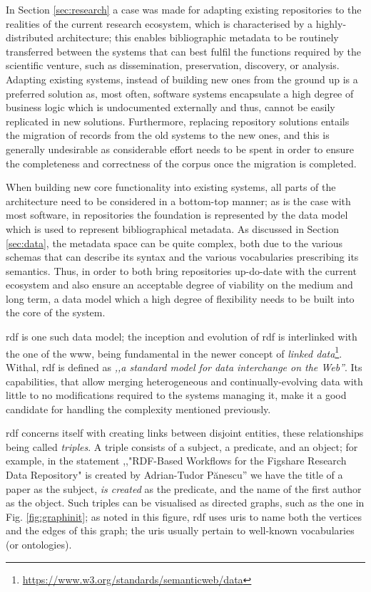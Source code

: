 In Section \ref{sec:research} a case was made for adapting existing repositories to the realities of the current research ecosystem, which is characterised by a highly-distributed architecture; this enables bibliographic metadata to be routinely transferred between the systems that can best fulfil the functions required by the scientific venture, such as dissemination, preservation, discovery, or analysis. Adapting existing systems, instead of building new ones from the ground up is a preferred solution as, most often, software systems encapsulate a high degree of business logic which is undocumented externally and thus, cannot be easily replicated in new solutions. Furthermore, replacing repository solutions entails the migration of records from the old systems to the new ones, and this is generally undesirable as considerable effort needs to be spent in order to ensure the completeness and correctness of the corpus once the migration is completed.

When building new core functionality into existing systems, all parts of the architecture need to be considered in a bottom-top manner; as is the case with most software, in repositories the foundation is represented by the data model which is used to represent bibliographical metadata. As discussed in Section \ref{sec:data}, the metadata space can be quite complex, both due to the various schemas that can describe its syntax and the various vocabularies prescribing its semantics. Thus, in order to both bring repositories up-do-date with the current ecosystem and also ensure an acceptable degree of viability on the medium and long term, a data model which a high degree of flexibility needs to be built into the core of the system.

\gls{rdf} is one such data model; the inception and evolution of \gls{rdf} is interlinked with the one of the \gls{www}, being fundamental in the newer concept of \emph{linked data}\footnote{\url{https://www.w3.org/standards/semanticweb/data}}. Withal, \gls{rdf} is defined as \emph{,,a standard model for data interchange on the Web''}\cite{rdf}. Its capabilities, that allow merging heterogeneous and continually-evolving data with little to no modifications required to the systems managing it, make it a good candidate for handling the complexity mentioned previously. 

\gls{rdf} concerns itself with creating links between disjoint entities, these relationships being called \emph{triples}. 
A triple consists of a subject, a predicate, and an object; for example, in the statement ,,"RDF-Based Workflows for the
Figshare Research Data Repository" is created by Adrian-Tudor P\u{a}nescu'' we have the title of a paper as the
subject, \emph{is created} as the predicate, and the name of the first author as the object. Such triples can be visualised
as directed graphs, such as the one in Fig. \ref{fig:graphinit}; as noted in this figure, \gls{rdf} uses \glspl{uri}
to name both the vertices and the edges of this graph; the \glspl{uri} usually pertain to well-known vocabularies (or ontologies).

